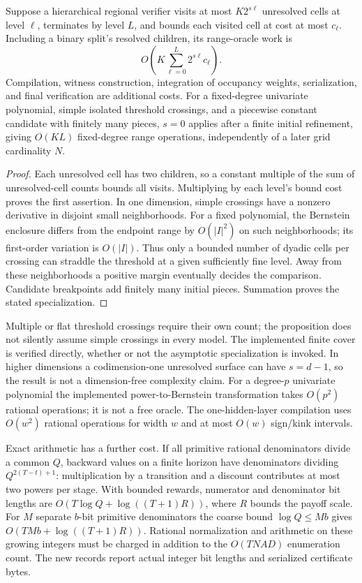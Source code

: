 \begin{proposition}\label{prop:work30}
Suppose a hierarchical regional verifier visits at most $K2^{s\ell}$ unresolved cells at level $\ell$, terminates by level $L$, and bounds each visited cell at cost at most $c_\ell$. Including a binary split's resolved children, its range-oracle work is
\begin{equation}
 O\!\left(K\sum_{\ell=0}^L2^{s\ell}c_\ell\right).
\end{equation}
Compilation, witness construction, integration of occupancy weights, serialization, and final verification are additional costs. For a fixed-degree univariate polynomial, simple isolated threshold crossings, and a piecewise constant candidate with finitely many pieces, $s=0$ applies after a finite initial refinement, giving $O(KL)$ fixed-degree range operations, independently of a later grid cardinality $N$.
\end{proposition}
\begin{proof}
Each unresolved cell has two children, so a constant multiple of the sum of unresolved-cell counts bounds all visits. Multiplying by each level's bound cost proves the first assertion. In one dimension, simple crossings have a nonzero derivative in disjoint small neighborhoods. For a fixed polynomial, the Bernstein enclosure differs from the endpoint range by $O(|I|^2)$ on such neighborhoods; its first-order variation is $O(|I|)$. Thus only a bounded number of dyadic cells per crossing can straddle the threshold at a given sufficiently fine level. Away from these neighborhoods a positive margin eventually decides the comparison. Candidate breakpoints add finitely many initial pieces. Summation proves the stated specialization.\end{proof}
Multiple or flat threshold crossings require their own count; the proposition does not silently assume simple crossings in every model. The implemented finite cover is verified directly, whether or not the asymptotic specialization is invoked. In higher dimensions a codimension-one unresolved surface can have $s=d-1$, so the result is not a dimension-free complexity claim. For a degree-$p$ univariate polynomial the implemented power-to-Bernstein transformation takes $O(p^2)$ rational operations; it is not a free oracle. The one-hidden-layer compilation uses $O(w^2)$ rational operations for width $w$ and at most $O(w)$ sign/kink intervals.

Exact arithmetic has a further cost. If all primitive rational denominators divide a common $Q$, backward values on a finite horizon have denominators dividing $Q^{2(T-t)+1}$: multiplication by a transition and a discount contributes at most two powers per stage. With bounded rewards, numerator and denominator bit lengths are $O(T\log Q+\log((T+1)R))$, where $R$ bounds the payoff scale. For $M$ separate $b$-bit primitive denominators the coarse bound $\log Q\le Mb$ gives $O(TMb+\log((T+1)R))$. Rational normalization and arithmetic on these growing integers must be charged in addition to the $O(TNAD)$ enumeration count. The new records report actual integer bit lengths and serialized certificate bytes.

